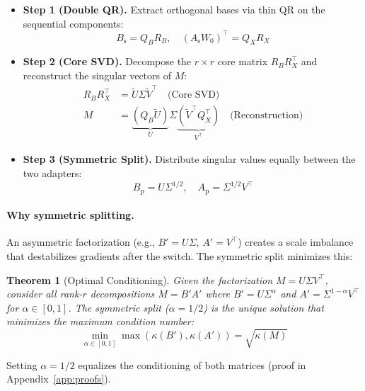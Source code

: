 \documentclass{article}
\newtheorem{theorem}{Theorem}
\newcommand{\Wbase}{W_0}
\newcommand{\Aseq}{A_{\mathrm{s}}}
\newcommand{\Bseq}{B_{\mathrm{s}}}
\newcommand{\Apar}{A_{\mathrm{p}}}
\newcommand{\Bpar}{B_{\mathrm{p}}}
\begin{document}
\begin{itemize}
    \item \textbf{Step 1 (Double QR).} Extract orthogonal bases via thin QR on the sequential components:
    \begin{equation}
    \Bseq = Q_B R_B, \quad (\Aseq \Wbase)^\top = Q_X R_X
    \end{equation}
    
    \item \textbf{Step 2 (Core SVD).} Decompose the $r \times r$ core matrix $R_B R_X^\top$ and reconstruct the singular vectors of $M$:
    \begin{align}
    R_B R_X^\top &= \widetilde{U} \Sigma \widetilde{V}^\top \quad \text{(Core SVD)} \\
    M &= \underbrace{(Q_B \widetilde{U})}_{U} \Sigma \underbrace{(\widetilde{V}^\top Q_X^\top)}_{V^\top} \quad \text{(Reconstruction)}
    \end{align}
    
    \item \textbf{Step 3 (Symmetric Split).} Distribute singular values equally between the two adapters:
    \begin{equation}
    \Bpar = U \Sigma^{1/2}, \quad \Apar = \Sigma^{1/2} V^\top
    \end{equation}
\end{itemize}

\paragraph{Why symmetric splitting.}
An asymmetric factorization (e.g., $B' = U\Sigma$, $A' = V^\top$) creates a scale imbalance that destabilizes gradients after the switch. The symmetric split minimizes this:

\begin{theorem}[Optimal Conditioning]
\label{thm:condition}
Given the factorization $M = U \Sigma V^\top$, consider all rank-$r$ decompositions $M = B'A'$ where $B' = U\Sigma^\alpha$ and $A' = \Sigma^{1-\alpha} V^\top$ for $\alpha \in [0,1]$. The symmetric split ($\alpha = 1/2$) is the unique solution that minimizes the maximum condition number:
\begin{equation*}
    \min_{\alpha \in [0,1]} \max \left( \kappa(B'), \kappa(A') \right) = \sqrt{\kappa(M)}
\end{equation*}
\end{theorem}

Setting $\alpha=1/2$ equalizes the conditioning of both matrices (proof in Appendix~\ref{app:proofs}).
\end{document}
